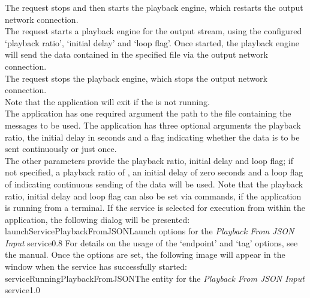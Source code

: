 The  request stops and then
starts the playback engine, which restarts the output \yarp{} network connection.\\

The  request starts a playback
engine for the output stream, using the configured `playback ratio', `initial delay' and
`loop flag'.
Once started, the playback engine will send the data contained in the specified file via
the output \yarp{} network connection.\\

The  request stops the playback
engine, which stops the output \yarp{} network connection.\\ 

Note that the application will exit if the  is not
running.\\

The application has one required argument \longDash{} the path to the \json{} file
containing the messages to be used.
The application has three optional arguments \longDash{} the playback ratio, the initial
delay in seconds and a flag indicating whether the data is to be sent continuously or just
once.
\insertAppParameters
{}
\insertInputServiceComment\\

The other parameters provide the playback ratio, initial delay and loop flag; if not
specified, a playback ratio of , an initial delay of zero seconds and a loop
flag of  \longDash{} indicating continuous sending of the data \longDash{}
will be used.
Note that the playback ratio, initial delay and loop flag can also be set via commands,
if the application is running from a terminal.
\condPage
\insertStandardServiceCommands{}
If the service is selected for execution from within the \emph{\MMMU} application, the
following dialog will be presented:
%
{launchServicePlaybackFromJSON}{Launch options for the \emph{Playback From JSON Input}
service}{0.8}
\condPage{}
For details on the usage of the `endpoint' and `tag' options, see the \emph{\MMMU} manual.
Once the options are set, the following image will appear in the \emph{\MMMU} window when
the service has successfully started:
%
{serviceRunningPlaybackFromJSON}{The \emph{\MMMU} entity for the \emph{Playback From JSON
Input} service}{1.0}

